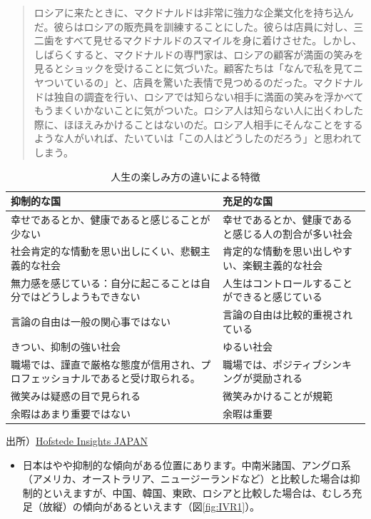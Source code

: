 \documentclass[
]{book}
\providecommand{\tightlist}{%
  \setlength{\itemsep}{0pt}\setlength{\parskip}{0pt}}
\begin{document}
\begin{quote}
ロシアに来たときに、マクドナルドは非常に強力な企業文化を持ち込んだ。彼らはロシアの販売員を訓練することにした。彼らは店員に対し、三二歯をすべて見せるマクドナルドのスマイルを身に着けさせた。しかし、しばらくすると、マクドナルドの専門家は、ロシアの顧客が満面の笑みを見るとショックを受けることに気づいた。顧客たちは「なんで私を見てニヤついているの」と、店員を驚いた表情で見つめるのだった。マクドナルドは独自の調査を行い、ロシアでは知らない相手に満面の笑みを浮かべてもうまくいかないことに気がついた。ロシア人は知らない人に出くわした際に、ほほえみかけることはないのだ。ロシア人相手にそんなことをするような人がいれば、たいていは「この人はどうしたのだろう」と思われてしまう。
\end{quote}

\begin{table}

\caption{\label{tab:IVR0}人生の楽しみ方の違いによる特徴}
\centering
\begin{tabular}[t]{l|l}
\hline
抑制的な国 & 充足的な国\\
\hline
幸せであるとか、健康であると感じることが少ない & 幸せであるとか、健康であると感じる人の割合が多い社会\\
\hline
社会肯定的な情動を思い出しにくい、悲観主義的な社会 & 肯定的な情動を思い出しやすい、楽観主義的な社会\\
\hline
無力感を感じている：自分に起こることは自分ではどうしようもできない & 人生はコントロールすることができると感じている\\
\hline
言論の自由は一般の関心事ではない & 言論の自由は比較的重視されている\\
\hline
きつい、抑制の強い社会 & ゆるい社会\\
\hline
職場では、謹直で厳格な態度が信用され、プロフェッショナルであると受け取られる。 & 職場では、ポジティブシンキングが奨励される\\
\hline
微笑みは疑惑の目で見られる & 微笑みかけることが規範\\
\hline
余暇はあまり重要ではない & 余暇は重要\\
\hline
\end{tabular}
\end{table}

出所）\href{https://hofstede.jp/6dimentionsmodel_ivr/}{Hofstede Insights JAPAN}

\begin{itemize}
\tightlist
\item
  日本はやや抑制的な傾向がある位置にあります。中南米諸国、アングロ系（アメリカ、オーストラリア、ニュージーランドなど）と比較した場合は抑制的といえますが、中国、韓国、東欧、ロシアと比較した場合は、むしろ充足（放縦）の傾向があるといえます（図\ref{fig:IVR1}）。
\end{itemize}
\end{document}
